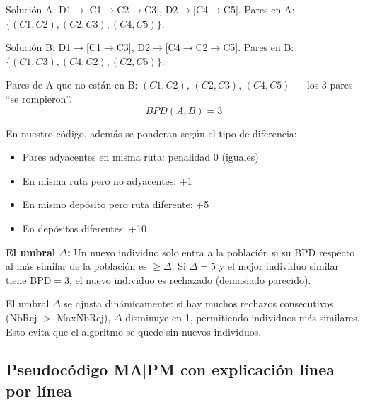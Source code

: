 \documentclass[12pt,a4paper]{article}
\begin{document}
\begin{ejemplo}
Solución A: D1$\to$[C1$\to$C2$\to$C3], D2$\to$[C4$\to$C5].
Pares en A: $\{(C1,C2), (C2,C3), (C4,C5)\}$.

Solución B: D1$\to$[C1$\to$C3], D2$\to$[C4$\to$C2$\to$C5].
Pares en B: $\{(C1,C3), (C4,C2), (C2,C5)\}$.

Pares de A que no están en B: $(C1,C2)$, $(C2,C3)$, $(C4,C5)$ --- los 3 pares ``se rompieron''.
$$BPD(A, B) = 3$$

En nuestro código, además se ponderan según el tipo de diferencia:
\begin{itemize}
\item Pares adyacentes en misma ruta: penalidad 0 (iguales)
\item En misma ruta pero no adyacentes: +1
\item En mismo depósito pero ruta diferente: +5
\item En depósitos diferentes: +10
\end{itemize}
\end{ejemplo}

\textbf{El umbral $\Delta$:} Un nuevo individuo solo entra a la población si su BPD respecto al más similar de la población es $\geq \Delta$. Si $\Delta = 5$ y el mejor individuo similar tiene BPD$=3$, el nuevo individuo es rechazado (demasiado parecido).

\begin{nota}
El umbral $\Delta$ se ajusta dinámicamente: si hay muchos rechazos consecutivos (NbRej $>$ MaxNbRej), $\Delta$ disminuye en 1, permitiendo individuos más similares. Esto evita que el algoritmo se quede sin nuevos individuos.
\end{nota}

\subsection{Pseudocódigo MA$|$PM con explicación línea por línea}
\end{document}
